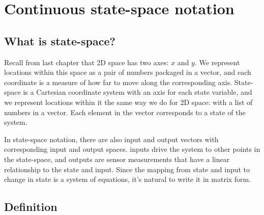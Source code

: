\section{Continuous state-space notation}

\subsection{What is state-space?}

Recall from last chapter that 2D space has two axes: $x$ and $y$. We represent
locations within this space as a pair of numbers packaged in a vector, and each
coordinate is a measure of how far to move along the corresponding axis.
State-space is a Cartesian coordinate system with an axis for each \gls{state}
variable, and we represent locations within it the same way we do for 2D space:
with a list of numbers in a vector. Each element in the vector corresponds to a
\gls{state} of the \gls{system}.

In state-space notation, there are also \gls{input} and \gls{output} vectors
with corresponding \gls{input} and \gls{output} spaces. \Glspl{input} drive the
\gls{system} to other points in the state-space, and \glspl{output} are sensor
measurements that have a linear relationship to the \gls{state} and \gls{input}.
Since the mapping from \gls{state} and \gls{input} to change in \gls{state} is a
system of equations, it's natural to write it in matrix form.

\subsection{Definition}

